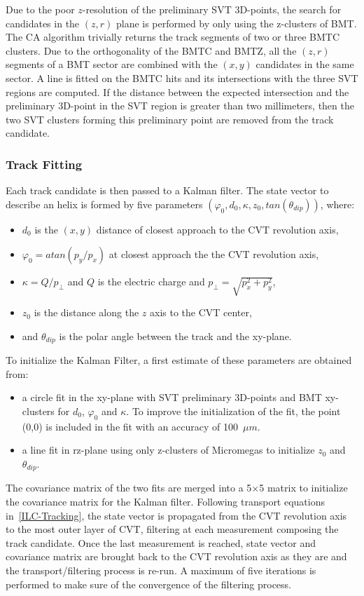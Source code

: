 \documentclass[3p,times,twocolumn]{elsarticle}
\begin{document}
Due to the poor $z$-resolution of the preliminary SVT 3D-points, the search for candidates in the $(z,r)$ plane is
performed by only using
the z-clusters of BMT. The CA algorithm trivially returns the track segments of two or three BMTC clusters.
Due to the orthogonality of the BMTC and BMTZ, all the $(z,r)$ segments of a BMT sector are combined with the $(x,y)$
candidates in the same sector. A line is fitted on the BMTC hits and its intersections with the three SVT regions are
computed. If the distance between the expected intersection and the preliminary 3D-point in the SVT region is greater
than two millimeters, then the two SVT clusters forming this preliminary point are removed from the track candidate.

\subsubsection{Track Fitting}

Each track candidate is then passed to a Kalman filter. The state vector to describe an helix is formed by five
parameters $(\varphi_0, d_0, \kappa, z_0, tan(\theta_{dip}))$, where:
\begin{itemize}
\item $d_0$ is the $(x,y)$ distance of closest approach to the CVT revolution axis,
\item $\varphi_0 = atan(p_y/p_x)$ at closest approach the the CVT revolution axis,
\item $\kappa=Q/p_\perp$ and $Q$ is the electric charge and $p_\perp=\sqrt{p_x^2+p_y^2}$,
\item $z_0$ is the distance along the $z$ axis to the CVT center,
\item and $\theta_{dip}$ is the polar angle between the track and the xy-plane.
\end{itemize}

To initialize the Kalman Filter, a first estimate of these parameters are obtained from:
\begin{itemize}
\item a circle fit in the xy-plane with SVT preliminary 3D-points and BMT xy-clusters for $d_0$, $\varphi_0$ and
$\kappa$. To improve the initialization of the fit, the point (0,0) is included in the fit with an accuracy of 100~$\mu
m$.
\item a line fit in rz-plane using only z-clusters of Micromegas to initialize $z_0$ and $\theta_{dip}$.
\end{itemize}
The covariance matrix of the two fits are merged into a 5$\times$5 matrix to initialize the covariance matrix for the
Kalman filter. Following transport equations in~\ref{ILC-Tracking}, the state vector is propagated from the CVT
revolution axis to the most outer layer of CVT, filtering at each measurement composing the track candidate. Once the
last measurement is reached, state vector and covariance matrix are brought back to the CVT revolution axis as they are
and the transport/filtering process is re-run. A maximum of five iterations is performed to make sure of the
convergence of the filtering process.
\end{document}

